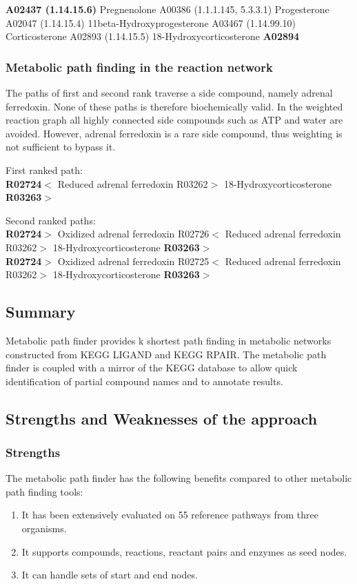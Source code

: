 \textbf{A02437 (1.14.15.6)} Pregnenolone A00386 (1.1.1.145, 5.3.3.1) Progesterone A02047 (1.14.15.4) 11beta-Hydroxyprogesterone A03467 (1.14.99.10) Corticosterone A02893 (1.14.15.5) 18-Hydroxycorticosterone \textbf{A02894}

\subsubsection{Metabolic path finding in the reaction network}

The paths of first and second rank traverse a side compound, namely adrenal ferredoxin. None of these paths is therefore biochemically valid.
In the weighted reaction graph all highly connected side compounds such as ATP and water are avoided. However, adrenal ferredoxin
is a rare side compound, thus weighting is not sufficient to bypass it.

First ranked path:\\
\textbf{R02724$<$} Reduced adrenal ferredoxin R03262$>$ 18-Hydroxycorticosterone \textbf{R03263$>$}

Second ranked paths:\\

\textbf{R02724$>$} Oxidized adrenal ferredoxin R02726$<$ Reduced adrenal ferredoxin R03262$>$ 18-Hydroxycorticosterone \textbf{R03263$>$}\\

\textbf{R02724$>$} Oxidized adrenal ferredoxin R02725$<$ Reduced adrenal ferredoxin R03262$>$ 18-Hydroxycorticosterone \textbf{R03263$>$}

\subsection{Summary}

Metabolic path finder provides k shortest path finding in metabolic networks constructed from KEGG LIGAND and KEGG RPAIR.
The metabolic path finder is coupled with a mirror of the KEGG database to allow quick identification of partial compound
names and to annotate results.

\subsection{Strengths and Weaknesses of the approach}

\subsubsection{Strengths}
The metabolic path finder has the following benefits compared to other metabolic path finding tools:
\begin{enumerate}

\item It has been extensively evaluated on 55 reference pathways from three organisms.

\item It supports compounds, reactions, reactant pairs and enzymes as seed nodes.

\item It can handle sets of start and end nodes.

\end{enumerate}

